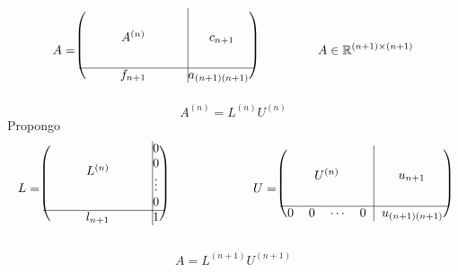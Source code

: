\begin{itemize}
	\[A = 
	\begin{blockarray}{cccc|c}
    \begin{block}{(cccc@{\hspace*{45pt}}|c@{\hspace*{5pt}})}
    \BAmulticolumn{4}{c|}{\multirow{4}{*}{$A^{(n)}$}}&\BAmulticolumn{1}{c}{\multirow{4}{*}{$c_{n+1}$}}\\
	&&&&\\
    &&&&\\
    &&&&\\
    \cline{1-5}%
    \BAmulticolumn{4}{c|}{f_{n+1}}&a_{(n+1)(n+1)} \\
    \end{block}
  \end{blockarray}
  \hspace{5em} A \in \mathbb{R}^{(n+1)\times(n+1)} 
  \]
  \[ A^{(n)} = L^{(n)}U^{(n)}\]
  Propongo
  \[ L =
  \begin{blockarray}{cccc|c}
    \begin{block}{(cccc@{\hspace*{45pt}}|c@{\hspace*{5pt}})}
    \BAmulticolumn{4}{c|}{\multirow{4}{*}{$L^{(n)}$}}&0 \\
	&&&& 0\\
    &&&& \vdots\\
    &&&& 0\\
    \cline{1-5}%
    \BAmulticolumn{4}{c|}{l_{n+1}}& 1 \\
    \end{block}
  \end{blockarray}
  \hspace{7em}
  U =
  \begin{blockarray}{cccc|c}
    \begin{block}{(cccc|c@{\hspace*{5pt}})}
    \BAmulticolumn{4}{c|}{\multirow{4}{*}{$U^{(n)}$}}&\BAmulticolumn{1}{c}{\multirow{4}{*}{$u_{n+1}$}}\\
	&&&&\\
    &&&&\\
    &&&&\\
    \cline{1-5}%
    0 & 0 & \cdots & 0 & u_{(n+1)(n+1)} \\
    \end{block}
  \end{blockarray}
  \]
  
  \[ A = L^{(n+1)} U^{(n+1)} \]
  

\end{itemize}
